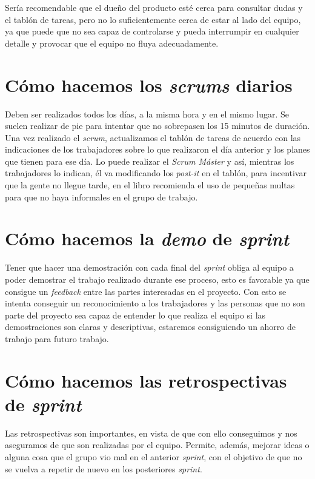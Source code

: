 Sería recomendable que el dueño del producto esté cerca para consultar dudas y el tablón de tareas, pero no lo suficientemente cerca de estar al lado del equipo, ya que puede que no sea capaz de controlarse y pueda interrumpir en cualquier detalle y provocar que el equipo no fluya adecuadamente.

\section{Cómo hacemos los \textit{scrums} diarios}

Deben ser realizados todos los días, a la misma hora y en el mismo lugar. Se suelen realizar de pie para intentar que no sobrepasen los 15 minutos de duración. Una vez realizado el \textit{scrum}, actualizamos el tablón de tareas de acuerdo con las indicaciones de los trabajadores sobre lo que realizaron el día anterior y los planes que tienen para ese día. Lo puede realizar el \textit{Scrum Máster} y así, mientras los trabajadores lo indican, él va modificando los \textit{post-it} en el tablón, para incentivar que la gente no llegue tarde, en el libro recomienda el uso de pequeñas multas para que no haya informales en el grupo de trabajo.

\section{Cómo hacemos la \textit{demo} de \textit{\textit{sprint}}}

Tener que hacer una demostración con cada final del \textit{sprint} obliga al equipo a poder demostrar el trabajo realizado durante ese proceso, esto es favorable ya que consigue un \textit{feedback} entre las partes interesadas en el proyecto. Con esto se intenta conseguir un reconocimiento a los trabajadores y las personas que no son parte del proyecto sea capaz de entender lo que realiza el equipo si las demostraciones son claras y descriptivas, estaremos consiguiendo un ahorro de trabajo para futuro trabajo.

\section{Cómo hacemos las retrospectivas de \textit{sprint}}

Las retrospectivas son importantes, en vista de que con ello conseguimos y nos aseguramos de que son realizadas por el equipo. Permite, además, mejorar ideas o alguna cosa que el grupo vio mal en el anterior \textit{sprint}, con el objetivo de que no se vuelva a repetir de nuevo en los posteriores \textit{sprint}.

